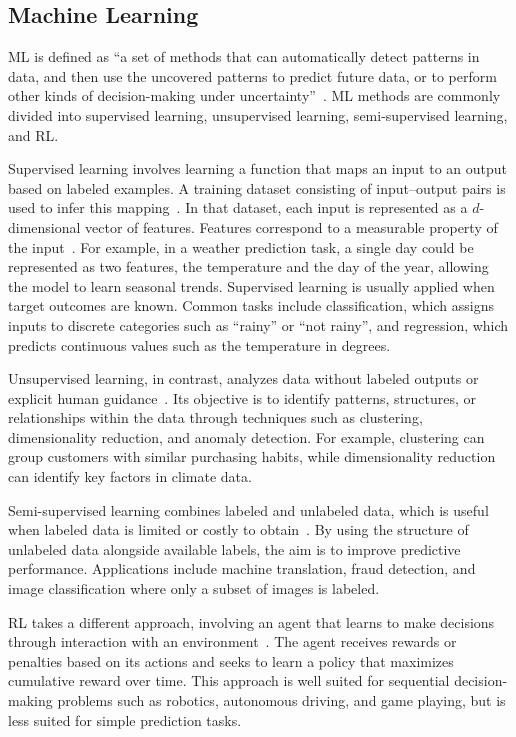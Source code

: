 \documentclass[
english,                 %
bibtex,                  %
includeExtraAbstracts, %
]{kththesis}
\numberwithin{listing}{chapter}
\begin{document}
\subsection{Machine Learning}

\Gls{ML} is defined as ``a set of methods that can automatically detect patterns in data, and then use the uncovered patterns to predict future data, or to perform other kinds of decision-making under uncertainty''~\cite{murphy_machine_2013}. \Gls{ML} methods are commonly divided into supervised learning, unsupervised learning, semi-supervised learning, and \gls{RL}.

Supervised learning involves learning a function that maps an input to an output based on labeled examples. A training dataset consisting of input–output pairs is used to infer this mapping~\cite{sarker_machine_2021}. In that dataset, each input is represented as a $d$-dimensional vector of features. Features correspond to a measurable property of the input~\cite{murphy_machine_2013}. For example, in a weather prediction task, a single day could be represented as two features, the temperature and the day of the year, allowing the model to learn seasonal trends. Supervised learning is usually applied when target outcomes are known. Common tasks include classification, which assigns inputs to discrete categories such as ``rainy'' or ``not rainy'', and regression, which predicts continuous values such as the temperature in degrees.

Unsupervised learning, in contrast, analyzes data without labeled outputs or explicit human guidance~\cite{sarker_machine_2021}. Its objective is to identify patterns, structures, or relationships within the data through techniques such as clustering, dimensionality reduction, and anomaly detection. For example, clustering can group customers with similar purchasing habits, while dimensionality reduction can identify key factors in climate data.

Semi-supervised learning combines labeled and unlabeled data, which is useful when labeled data is limited or costly to obtain~\cite{sarker_machine_2021}. By using the structure of unlabeled data alongside available labels, the aim is to improve predictive performance. Applications include machine translation, fraud detection, and image classification where only a subset of images is labeled.

\Gls{RL} takes a different approach, involving an agent that learns to make decisions through interaction with an environment~\cite{arulkumaran_deep_2017}. The agent receives rewards or penalties based on its actions and seeks to learn a policy that maximizes cumulative reward over time. This approach is well suited for sequential decision-making problems such as robotics, autonomous driving, and game playing, but is less suited for simple prediction tasks.
\end{document}
